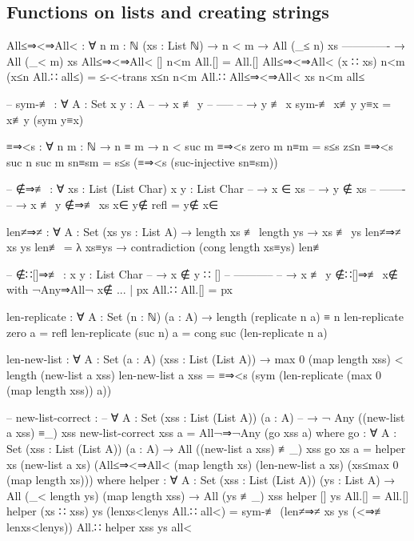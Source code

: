 \documentclass[logo,bsc,singlespacing,parskip,online]{infthesis}
\renewenvironment{code}{\mintedcopy[breaklines,breaksymbolleft=\;]{agda}}{\endmintedcopy}
\begin{document}
\subsection{Functions on lists and creating strings}
\label{appendix:list_functions}
\begin{code}
All≤⇒<⇒All< : ∀ {n m : ℕ} (xs : List ℕ)
  → n < m
  → All (_≤ n) xs
    -------------
  → All (_< m) xs
All≤⇒<⇒All< [] n<m All.[] = All.[]
All≤⇒<⇒All< (x ∷ xs) n<m (x≤n All.∷ all≤) =
  ≤-<-trans x≤n n<m All.∷ All≤⇒<⇒All< xs n<m all≤

-- sym-≢ : ∀ {A : Set} {x y : A}
--   → x ≢ y
--     -----
--   → y ≢ x
sym-≢ x≢y y≡x = x≢y (sym y≡x)

≡⇒<s : ∀ {n m : ℕ} → n ≡ m → n < suc m
≡⇒<s {zero} {m} n≡m = s≤s z≤n
≡⇒<s {suc n} {suc m} sn≡sm = s≤s (≡⇒<s (suc-injective sn≡sm))

-- ∉⇒≢ : ∀ {xs : List (List Char)} {x y : List Char}
--   → x ∈ xs
--   → y ∉ xs
--     -------
--   → x ≢ y
∉⇒≢ {xs} x∈ y∉ refl = y∉ x∈

len≠⇒≠ : ∀ {A : Set} (xs ys : List A)
  → length xs ≢ length ys → xs ≢ ys
len≠⇒≠ xs ys len≢ =
  λ xs≡ys → contradiction (cong length xs≡ys) len≢

-- ∉∷[]⇒≢ : {x y : List Char}
--   → x ∉ y ∷ []
--     -----------
--   → x ≢ y
∉∷[]⇒≢ x∉ with ¬Any⇒All¬ x∉
... | px All.∷ All.[] = px

len-replicate : ∀ {A : Set} (n : ℕ) (a : A)
  → length (replicate n a) ≡ n
len-replicate zero a = refl
len-replicate (suc n) a = cong suc (len-replicate n a)

len-new-list : ∀ {A : Set} (a : A) (xss : List (List A))
  → max 0 (map length xss) < length (new-list a xss)
len-new-list a xss =
  ≡⇒<s (sym (len-replicate (max 0 (map length xss)) a))

-- new-list-correct :
--   ∀ {A : Set} (xss : List (List A)) (a : A)
--   → ¬ Any ((new-list a xss) ≡_) xss
new-list-correct xss a = All¬⇒¬Any (go xss a)
  where
    go : ∀ {A : Set} (xss : List (List A)) (a : A)
      → All ((new-list a xss) ≢_) xss
    go xs a =
      helper
        xs
        (new-list a xs)
        (All≤⇒<⇒All<
          (map length xs)
          (len-new-list a xs)
          (xs≤max 0 (map length xs)))
      where
        helper : ∀ {A : Set} (xss : List (List A)) (ys : List A)
          → All (_< length ys) (map length xss)
          → All (ys ≢_) xss
        helper [] ys All.[] = All.[]
        helper (xs ∷ xss) ys (lenxs<lenys All.∷ all<) =
          sym-≢ (len≠⇒≠ xs ys (<⇒≢ lenxs<lenys))
            All.∷ helper xss ys all<
\end{code}
\end{document}
